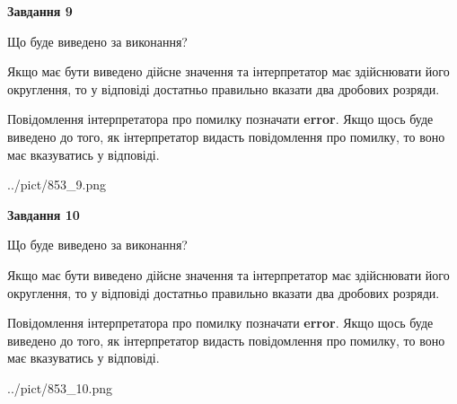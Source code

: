 \documentclass[12pt, ukrainian]{article}
\begin{document}
{\begin {Large}
{\begin {center}\textbf{Завдання 9}\end {center}}\par
Що буде виведено за виконання? \par

Якщо має бути виведено дійсне значення та інтерпретатор має здійснювати його округлення, 
то у відповіді достатньо правильно вказати два дробових розряди.

Повідомлення інтерпретатора про помилку позначати \textbf{error}.
Якщо щось буде виведено до того, як інтерпретатор видасть повідомлення про помилку, 
то воно має вказуватись у відповіді. \par

\begin{center}
	{../pict/853_9.png}
\end{center}
\newpage

{\begin {center}\textbf{Завдання 10}\end {center}}\par
Що буде виведено за виконання? \par

Якщо має бути виведено дійсне значення та інтерпретатор має здійснювати його округлення, 
то у відповіді достатньо правильно вказати два дробових розряди.

Повідомлення інтерпретатора про помилку позначати \textbf{error}.
Якщо щось буде виведено до того, як інтерпретатор видасть повідомлення про помилку, 
то воно має вказуватись у відповіді. \par

\begin{center}
	{../pict/853_10.png}
\end{center}
\newpage

\end {Large}}
\end{document}
